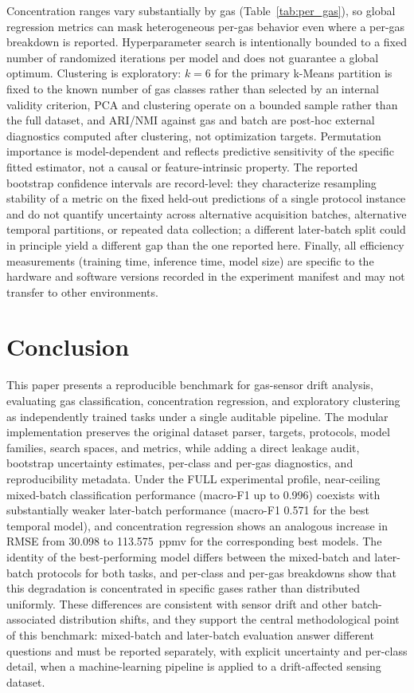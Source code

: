\documentclass[conference]{IEEEtran}
\begin{document}
Concentration ranges vary substantially by gas (Table~\ref{tab:per_gas}), so global regression metrics can mask heterogeneous per-gas behavior even where a per-gas breakdown is reported. Hyperparameter search is intentionally bounded to a fixed number of randomized iterations per model and does not guarantee a global optimum. Clustering is exploratory: $k=6$ for the primary k-Means partition is fixed to the known number of gas classes rather than selected by an internal validity criterion, PCA and clustering operate on a bounded sample rather than the full dataset, and ARI/NMI against gas and batch are post-hoc external diagnostics computed after clustering, not optimization targets. Permutation importance is model-dependent and reflects predictive sensitivity of the specific fitted estimator, not a causal or feature-intrinsic property. The reported bootstrap confidence intervals are record-level: they characterize resampling stability of a metric on the fixed held-out predictions of a single protocol instance and do not quantify uncertainty across alternative acquisition batches, alternative temporal partitions, or repeated data collection; a different later-batch split could in principle yield a different gap than the one reported here. Finally, all efficiency measurements (training time, inference time, model size) are specific to the hardware and software versions recorded in the experiment manifest and may not transfer to other environments.

\section{Conclusion}
This paper presents a reproducible benchmark for gas-sensor drift analysis, evaluating gas classification, concentration regression, and exploratory clustering as independently trained tasks under a single auditable pipeline. The modular implementation preserves the original dataset parser, targets, protocols, model families, search spaces, and metrics, while adding a direct leakage audit, bootstrap uncertainty estimates, per-class and per-gas diagnostics, and reproducibility metadata. Under the FULL experimental profile, near-ceiling mixed-batch classification performance (macro-F1 up to 0.996) coexists with substantially weaker later-batch performance (macro-F1 0.571 for the best temporal model), and concentration regression shows an analogous increase in RMSE from 30.098 to 113.575~ppmv for the corresponding best models. The identity of the best-performing model differs between the mixed-batch and later-batch protocols for both tasks, and per-class and per-gas breakdowns show that this degradation is concentrated in specific gases rather than distributed uniformly. These differences are consistent with sensor drift and other batch-associated distribution shifts, and they support the central methodological point of this benchmark: mixed-batch and later-batch evaluation answer different questions and must be reported separately, with explicit uncertainty and per-class detail, when a machine-learning pipeline is applied to a drift-affected sensing dataset.
\end{document}

